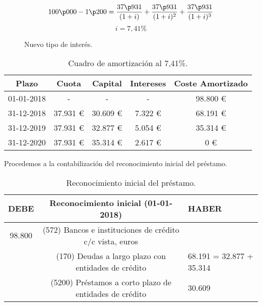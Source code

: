 \begin{figure}[H]
    \begin{equation*}
        100\p000 - 1\p200 = \frac{37\p931}{(1+i)} + \frac{37\p931}{(1+i)^2} + \frac{37\p931}{(1+i)^3}
    \end{equation*}
    \begin{equation*}
        i = 7,41\%
    \end{equation*}
    \caption{Nuevo tipo de interés.}
    \label{fig:nuevo_tipo_interes}
\end{figure}

\begin{table}[H]
    \centering
    \begin{tabular}{|c|c|c|c|c|}
        \hline
        \rowcolor{blue!30}
        \textbf{Plazo} & \textbf{Cuota} & \textbf{Capital} & \textbf{Intereses} & \textbf{Coste Amortizado} \\
        \hline
        01-01-2018 & - & - & - & 98.800 € \\
        \hline
        31-12-2018 & 37.931 € & 30.609 € & 7.322 € & 68.191 € \\
        \hline
        31-12-2019 & 37.931 € & 32.877 € & 5.054 € & 35.314 € \\
        \hline
        31-12-2020 & 37.931 € & 35.314 € & 2.617 € & 0 € \\
        \hline
    \end{tabular}
    \caption{Cuadro de amortización al 7,41\%.}
    \label{tabla:cuadro_amortizacion_ej1}
\end{table}

Procedemos a la contabilización del reconocimiento inicial del préstamo.

\begin{table}[H]
    \centering
    \begin{tabular}{|c|c|p{2cm}|}
        \hline
        \rowcolor{blue!30}
        \textbf{DEBE} & \textbf{Reconocimiento inicial (01-01-2018)} & \textbf{HABER} \\
        \hline
        98.800 & (572) Bancos e instituciones de crédito c/c vista, euros & \\
        \hline
        & (170) Deudas a largo plazo con entidades de crédito & 68.191 = 32.877 + 35.314 \\
        \hline
        & (5200) Préstamos a corto plazo de entidades de crédito & 30.609 \\
        \hline
    \end{tabular}
    \caption{Reconocimiento inicial del préstamo.}
    \label{tabla:reconocimiento_inicial}
\end{table}

